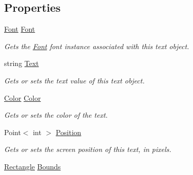 \subsection*{Properties}
\begin{DoxyCompactItemize}
\item 
\hyperlink{class_tri_devs_1_1_tri_engine_1_1_text_1_1_font}{Font} \hyperlink{interface_tri_devs_1_1_tri_engine_1_1_text_1_1_i_text_object_a638f5e225cfe81ed5312d7b8ec18ffb3}{Font}
\begin{DoxyCompactList}\small\item\em Gets the \hyperlink{class_tri_devs_1_1_tri_engine_1_1_text_1_1_font}{Font} font instance associated with this text object. \end{DoxyCompactList}\item 
string \hyperlink{interface_tri_devs_1_1_tri_engine_1_1_text_1_1_i_text_object_a3174625e154cefa41e4ed4540e736035}{Text}
\begin{DoxyCompactList}\small\item\em Gets or sets the text value of this text object. \end{DoxyCompactList}\item 
\hyperlink{struct_tri_devs_1_1_tri_engine_1_1_color}{Color} \hyperlink{interface_tri_devs_1_1_tri_engine_1_1_text_1_1_i_text_object_aa4dc850c84434169ccd61eb6d895412a}{Color}
\begin{DoxyCompactList}\small\item\em Gets or sets the color of the text. \end{DoxyCompactList}\item 
Point$<$ int $>$ \hyperlink{interface_tri_devs_1_1_tri_engine_1_1_text_1_1_i_text_object_a2d3a38a11fd0a84360e32122668901ab}{Position}
\begin{DoxyCompactList}\small\item\em Gets or sets the screen position of this text, in pixels. \end{DoxyCompactList}\item 
\hyperlink{struct_tri_devs_1_1_tri_engine_1_1_rectangle}{Rectangle} \hyperlink{interface_tri_devs_1_1_tri_engine_1_1_text_1_1_i_text_object_a145c9d010de6587d761db23074b61264}{Bounds}

\end{DoxyCompactItemize}
